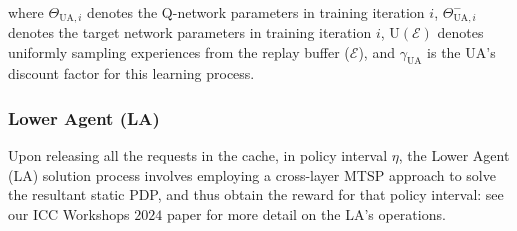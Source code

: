 \documentclass{article}
\begin{document}
\begin{itemize}
\begin{align}
    \end{align}
    where $\Theta_{\mathrm{UA},i}$ denotes the Q-network parameters in training iteration $i$, $\Theta_{\mathrm{UA},i}^{-}$ denotes the target network parameters in training iteration $i$, $\mathrm{U}(\mathcal{E})$ denotes uniformly sampling experiences from the replay buffer ($\mathcal{E}$), and $\gamma_{\mathrm{UA}}$ is the UA's discount factor for this learning process.
\end{itemize}

\subsubsection{Lower Agent (LA)}
Upon releasing all the requests in the cache, in policy interval $\eta$, the Lower Agent (LA) solution process involves employing a cross-layer MTSP approach to solve the resultant static PDP, and thus obtain the reward for that policy interval: see our ICC Workshops $2024$ paper for more detail on the LA's operations.
\end{document}
